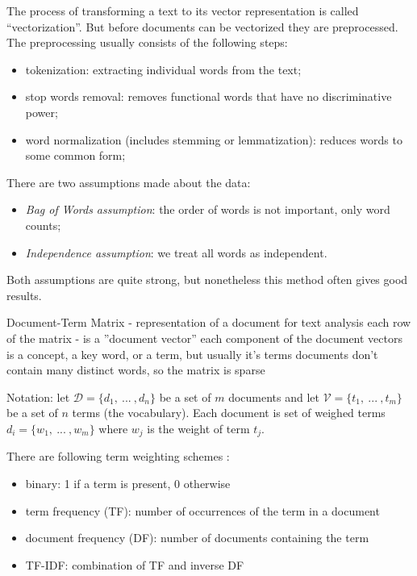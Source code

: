 The process of transforming a text to its vector representation is
called ``vectorization''. But before documents can be
vectorized they are preprocessed. The preprocessing usually consists of the
following steps:

\begin{itemize}
\itemsep1pt\parskip0pt
  \item tokenization: extracting individual words from the text;
  \item stop words removal: removes functional words that have no discriminative power;
  \item word normalization (includes stemming or lemmatization): reduces words to some common form;
\end{itemize}

There are two assumptions made about the data:

\begin{itemize}
\itemsep1pt\parskip0pt
  \item \emph{Bag of Words assumption}: the order of words is not important,
     only word counts;
  \item \emph{Independence assumption}: we treat all words as independent.
\end{itemize}


Both assumptions are quite strong, but nonetheless this method often
gives good results.


Document-Term Matrix - representation of a document for text analysis
each row of the matrix - is a ''document vector''
each component of the document vectors is a concept, a key word, or a term, but usually it's terms
documents don't contain many distinct words, so the matrix is sparse


Notation:
let $\mathcal D = \{d_1, \ ... \ , d_n \}$ be a set of $m$ documents
and let $\mathcal V = \{t_1, \ ... \ , t_m \}$ be a set of $n$ terms (the vocabulary).
Each document is set of weighed terms $d_i = \{ w_1, \ ... \ , w_m \}$
where $w_j$ is the weight of term $t_j$.

There are following term weighting schemes \cite{manning2008introduction}:

\begin{itemize}
\itemsep1pt\parskip0pt
  \item binary: 1 if a term is present, 0 otherwise
  \item term frequency (TF): number of occurrences of the term in a document
  \item document frequency (DF): number of documents containing the term
  \item TF-IDF: combination of TF and inverse DF
\end{itemize}


